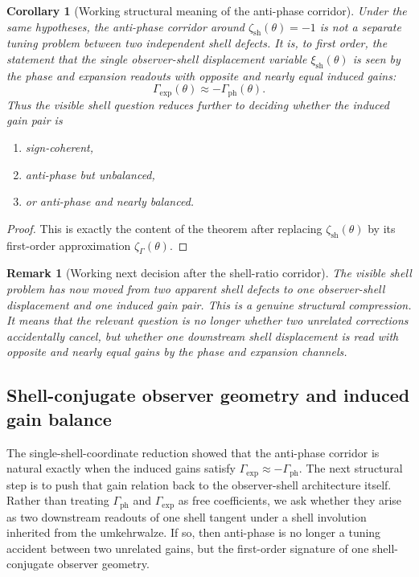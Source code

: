 \documentclass[12pt,a4paper]{article}
\newtheorem{corollary}[theorem]{Corollary}
\newtheorem{remark}[theorem]{Remark}
\begin{document}
\begin{corollary}[Working structural meaning of the anti-phase corridor]
Under the same hypotheses, the anti-phase corridor around $\zeta_{\mathrm{sh}}(\theta)=-1$ is not a separate tuning problem between two independent shell defects. It is, to first order, the statement that the single observer-shell displacement variable $\xi_{\mathrm{sh}}(\theta)$ is seen by the phase and expansion readouts with opposite and nearly equal induced gains:
\[
 \Gamma_{\mathrm{exp}}(\theta)\approx -\Gamma_{\mathrm{ph}}(\theta).
\]
Thus the visible shell question reduces further to deciding whether the induced gain pair is
\begin{enumerate}[leftmargin=2em,label=(\roman*)]
\item sign-coherent,
\item anti-phase but unbalanced,
\item or anti-phase and nearly balanced.
\end{enumerate}
\end{corollary}

\begin{proof}
This is exactly the content of the theorem after replacing $\zeta_{\mathrm{sh}}(\theta)$ by its first-order approximation $\zeta_{\Gamma}(\theta)$.
\end{proof}

\begin{remark}[Working next decision after the shell-ratio corridor]
The visible shell problem has now moved from two apparent shell defects to one observer-shell displacement and one induced gain pair. This is a genuine structural compression. It means that the relevant question is no longer whether two unrelated corrections accidentally cancel, but whether one downstream shell displacement is read with opposite and nearly equal gains by the phase and expansion channels.
\end{remark}


\subsection*{Shell-conjugate observer geometry and induced gain balance}
The single-shell-coordinate reduction showed that the anti-phase corridor is natural exactly when the induced gains satisfy $\Gamma_{\mathrm{exp}}\approx-\Gamma_{\mathrm{ph}}$. The next structural step is to push that gain relation back to the observer-shell architecture itself. Rather than treating $\Gamma_{\mathrm{ph}}$ and $\Gamma_{\mathrm{exp}}$ as free coefficients, we ask whether they arise as two downstream readouts of one shell tangent under a shell involution inherited from the umkehrwalze. If so, then anti-phase is no longer a tuning accident between two unrelated gains, but the first-order signature of one shell-conjugate observer geometry.
\end{document}
